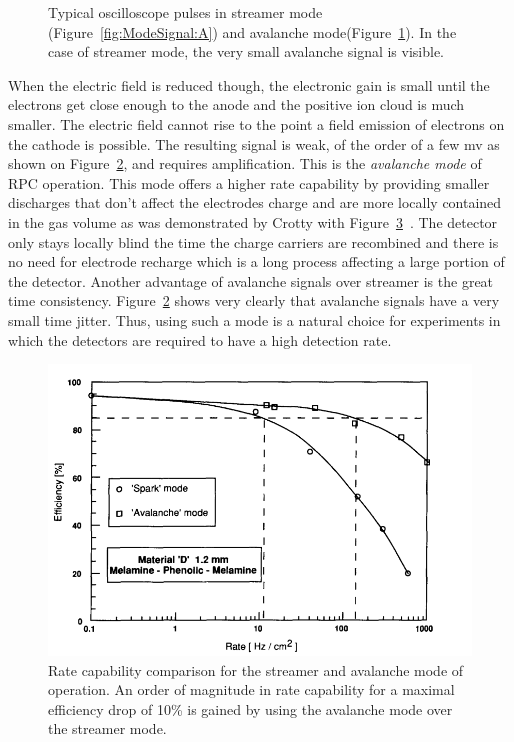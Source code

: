 \begin{figure}[H]
\begin{subfigure}{0.5\linewidth}
			\caption{\label{fig:ModeSignal:B}}
		\end{subfigure}
		\caption{\label{fig:ModeSignal} Typical oscilloscope pulses in streamer mode (Figure~\ref{fig:ModeSignal:A}) and avalanche mode(Figure~\ref{fig:ModeSignal:B}). In the case of streamer mode, the very small avalanche signal is visible.}
	\end{figure}
	
	When the electric field is reduced though, the electronic gain is small until the electrons get close enough to the anode and the positive ion cloud is much smaller. The electric field cannot rise to the point a field emission of electrons on the cathode is possible. The resulting signal is weak, of the order of a few \si{mv} as shown on Figure~\ref{fig:ModeSignal}, and requires amplification. This is the \textit{avalanche mode} of RPC operation. This mode offers a higher rate capability by providing smaller discharges that don't affect the electrodes charge and are more locally contained in the gas volume as was demonstrated by Crotty with Figure~\ref{fig:ModeRate}~\cite{CROTTY93}. The detector only stays locally blind the time the charge carriers are recombined and there is no need for electrode recharge which is a long process affecting a large portion of the detector. Another advantage of avalanche signals over streamer is the great time consistency. Figure~\ref{fig:ModeSignal} shows very clearly that avalanche signals have a very small time jitter. Thus, using such a mode is a natural choice for experiments in which the detectors are required to have a high detection rate.
	
	\begin{figure}[H]
		\centering
		\includegraphics[width = \plotwidth]{fig/chapt4/Rate_Mode_Comparison.png}
		\caption{\label{fig:ModeRate} Rate capability comparison for the streamer and avalanche mode of operation. An order of magnitude in rate capability for a maximal efficiency drop of 10\% is gained by using the avalanche mode over the streamer mode.}
	\end{figure}

